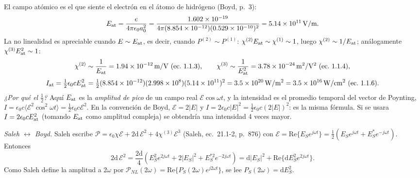  El campo atómico es el que siente el electrón en el átomo de hidrógeno (Boyd, p.~3):
\[
E_{\rm at}=\frac{e}{4\pi\epsilon_0a_0^2}=\frac{1.602\times10^{-19}}{4\pi(8.854\times10^{-12})(0.529\times10^{-10})^2}=\SI{5.14e11}{V/m}.
\]
La no linealidad es apreciable cuando $E\sim E_{\rm at}$, es decir, cuando $P^{(2)}\sim P^{(1)}$: $\chi^{(2)}E_{\rm at}\sim\chi^{(1)}\sim1$, luego $\chi^{(2)}\sim1/E_{\rm at}$; análogamente $\chi^{(3)}E_{\rm at}^2\sim1$:
\[
\chi^{(2)}\sim\frac1{E_{\rm at}}=\SI{1.94e-12}{m/V}\ \text{(ec.~1.1.3)},\qquad \chi^{(3)}\sim\frac1{E_{\rm at}^2}=\SI{3.78e-24}{m^2/V^2}\ \text{(ec.~1.1.4)},
\]
\[
I_{\rm at}=\tfrac12\epsilon_0cE_{\rm at}^2=\tfrac12(8.854\times10^{-12})(2.998\times10^8)(5.14\times10^{11})^2=\SI{3.5e20}{W/m^2}=\SI{3.5e16}{W/cm^2}\ \text{(ec.~1.1.6)}.
\]
\emph{¿Por qué el $\tfrac12$?} Aquí $E_{\rm at}$ es la \emph{amplitud de pico} de un campo real $\mathcal E\cos\omega t$, y la intensidad es el promedio temporal del vector de Poynting, $I=\epsilon_0c\langle\mathcal E^2\cos^2\omega t\rangle=\tfrac12\epsilon_0c\mathcal E^2$. En la convención de Boyd, $\mathcal E=2|E|$ y $I=2\epsilon_0c|E|^2=\tfrac12\epsilon_0c(2|E|)^2$: es la misma fórmula. Si se usara $I=2\epsilon_0cE_{\rm at}^2$ (tomando $E_{\rm at}$ como amplitud compleja) se obtendría una intensidad 4 veces mayor.

 \emph{Saleh $\leftrightarrow$ Boyd.} Saleh escribe $\mathcal P=\epsilon_0\chi\mathcal E+2\mathrm d\,\mathcal E^2+4\chi^{(3)}\mathcal E^3$ (Saleh, ec.~21.1-2, p.~876) con $\mathcal E=\mathrm{Re}\{E_Se^{j\omega t}\}=\tfrac12(E_Se^{j\omega t}+E_S^*e^{-j\omega t})$. Entonces
\[
2\mathrm d\,\mathcal E^2=\frac{2\mathrm d}{4}\left(E_S^2e^{2j\omega t}+2|E_S|^2+E_S^{*2}e^{-2j\omega t}\right)=\mathrm d|E_S|^2+\mathrm{Re}\{\mathrm dE_S^2e^{2j\omega t}\}.
\]
Como Saleh define la amplitud a $2\omega$ por $\mathcal P_{NL}(2\omega)=\mathrm{Re}\{P_S(2\omega)e^{j2\omega t}\}$, se lee $P_S(2\omega)=\mathrm dE_S^2$.


